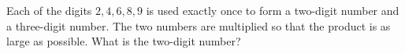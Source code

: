 Each of the digits $2,4,6,8,9$ is used exactly once to form a two-digit number and a three-digit number. The two numbers are multiplied so that the product is as large as possible. What is the two-digit number?
